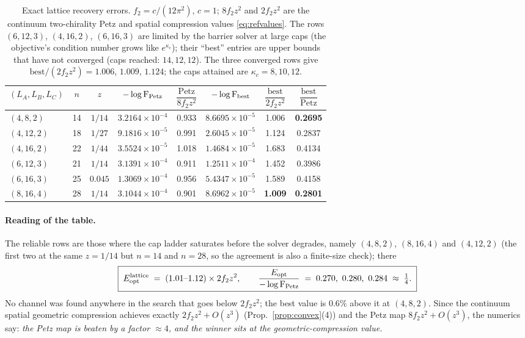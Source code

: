 \documentclass[11pt]{article}
\newcommand{\Erec}{E_{\mathrm{opt}}}
\begin{document}
\begin{table}[h]\centering\small
\begin{tabular}{lccccccc}
\toprule
\((L_A,L_B,L_C)\)&\(n\)&\(z\)&\(-\log\operatorname{F}_{\text{Petz}}\)&\(\dfrac{\text{Petz}}{8f_2z^2}\)&
\(-\log\operatorname{F}_{\text{best}}\)&\(\dfrac{\text{best}}{2f_2z^2}\)&\(\dfrac{\text{best}}{\text{Petz}}\)\\
\midrule
\((4,8,2)\) &14&\(1/14\)  &\(3.2164\times10^{-4}\)&0.933&\(8.6695\times10^{-5}\)&1.006&\textbf{0.2695}\\
\((4,12,2)\)&18&\(1/27\)  &\(9.1816\times10^{-5}\)&0.991&\(2.6045\times10^{-5}\)&1.124&0.2837\\
\((4,16,2)\)&22&\(1/44\)  &\(3.5524\times10^{-5}\)&1.018&\(1.4684\times10^{-5}\)&1.683&0.4134\\
\((6,12,3)\)&21&\(1/14\)  &\(3.1391\times10^{-4}\)&0.911&\(1.2511\times10^{-4}\)&1.452&0.3986\\
\((6,16,3)\)&25&\(0.045\) &\(1.3069\times10^{-4}\)&0.956&\(5.4347\times10^{-5}\)&1.589&0.4158\\
\((8,16,4)\)&28&\(1/14\)  &\(3.1044\times10^{-4}\)&0.901&\(8.6962\times10^{-5}\)&\textbf{1.009}&\textbf{0.2801}\\
\bottomrule
\end{tabular}
\caption{Exact lattice recovery errors.  \(f_2=c/(12\pi^2)\), \(c=1\);
\(8f_2z^2\) and \(2f_2z^2\) are the continuum two-chirality Petz and spatial
compression values \eqref{eq:refvalues}.  The rows \((6,12,3)\), \((4,16,2)\),
\((6,16,3)\) are limited by the barrier solver at large caps (the objective's
condition number grows like \(e^{\kappa_c}\)); their ``best'' entries are upper
bounds that have not converged (caps reached: \(14,12,12\)).  The three
converged rows give
\(\text{best}/(2f_2z^2)=1.006\), \(1.009\), \(1.124\); the caps attained are
\(\kappa_c=8,10,12\).}
\label{tab:opt}
\end{table}

\paragraph{Reading of the table.}
The reliable rows are those where the cap ladder saturates before the solver
degrades, namely \((4,8,2)\), \((8,16,4)\) and \((4,12,2)\) (the first two at the
same \(z=1/14\) but \(n=14\) and \(n=28\), so the agreement is also a finite-size
check); there
\begin{equation}\label{eq:main-number}
 \boxed{\;\Erec^{\text{lattice}}\;=\;(1.01\text{--}1.12)\times 2f_2z^2,
 \qquad \frac{\Erec}{-\log\Fid_{\text{Petz}}}\;=\;0.270,\ 0.280,\ 0.284
 \;\approx\;\tfrac14 .\;}
\end{equation}
No channel was found anywhere in the search that goes below \(2f_2z^2\); the
best value is \(0.6\%\) above it at \((4,8,2)\).  Since the continuum spatial
geometric compression achieves exactly \(2f_2z^2+O(z^3)\)
(Prop.~\ref{prop:convex}(4)) and the Petz map \(8f_2z^2+O(z^3)\), the numerics
say: \emph{the Petz map is beaten by a factor \(\approx4\), and the winner sits
at the geometric-compression value.}
\end{document}
